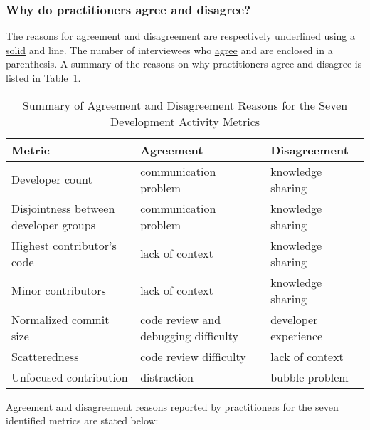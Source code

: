 \documentclass[smallextended]{svjour3}       %
\begin{document}
\subsubsection{Why do practitioners agree and disagree?}
\label{res-rq1-reasons} 

The reasons for agreement and disagreement are respectively underlined using a \ul{solid} and  line. The number of interviewees who \ul{agree} and  are enclosed in a parenthesis. A summary of the reasons on why practitioners agree and disagree is listed in Table~\ref{tab-res-rq2-agr-dis}.

\begin{table}[]
\footnotesize
\captionsetup{justification=centering}
\caption{Summary of Agreement and Disagreement Reasons for the Seven Development Activity Metrics}
\centering
\label{tab-res-rq2-agr-dis}
\begin{tabular}{p{4cm}p{3cm}p{3cm}}
\hline
\textbf{Metric} & \textbf{Agreement} & \textbf{Disagreement} \\
\hline
Developer count &  communication problem & knowledge sharing \\
\hline
Disjointness  between  developer  groups  &  communication problem & knowledge sharing \\
\hline
Highest  contributor's  code  &  lack of context & knowledge sharing \\
\hline
Minor  contributors    &  lack of context & knowledge sharing \\
\hline
Normalized commit size &  code review and debugging difficulty & developer experience \\
\hline
Scatteredness &  code review difficulty & lack of context \\
\hline
Unfocused  contribution  &  distraction & bubble problem \\
\hline
\end{tabular}
\end{table} 

Agreement and disagreement reasons reported by practitioners for the seven identified metrics are stated below:

\end{document}
